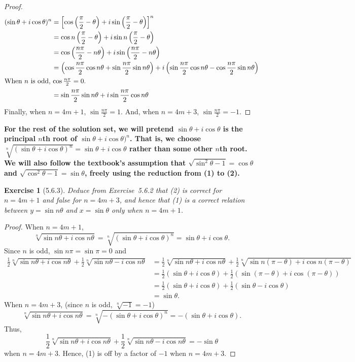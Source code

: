 \documentclass[12pt]{article}
\theoremstyle{plain}
\newtheorem{ex}{Exercise}
\begin{document}
\begin{proof}
  \begin{align*}
    (\sin\theta+i\cos\theta)^n  &= \left[\cos\left(\frac{\pi}{2}-\theta\right)+i\sin\left(\frac{\pi}{2}-\theta\right)\right]^n \\
                                &= \cos n\left(\frac{\pi}{2}-\theta\right)+i\sin n\left(\frac{\pi}{2}-\theta\right) \\
                                &= \cos\left(\frac{n\pi}{2}-n\theta\right)+i\sin\left(\frac{n\pi}{2}-n\theta\right) \\
                                &= \left(\cos\frac{n\pi}{2}\cos n\theta+\sin\frac{n\pi}{2}\sin n\theta\right)+i\left(\sin\frac{n\pi}{2}\cos n\theta-\cos\frac{n\pi}{2}\sin n\theta\right) \\
    \intertext{When $n$ is odd, $\cos\frac{n\pi}{2}=0$.}
                                &= \sin\frac{n\pi}{2}\sin n\theta+i\sin\frac{n\pi}{2}\cos n\theta
  \end{align*}
  Finally, when $n=4m+1$, $\sin\frac{n\pi}{2}=1$. And, when $n=4m+3$, $\sin\frac{n\pi}{2}=-1$.
\end{proof}

\textbf{For the rest of the solution set, we will pretend $\sin\theta+i\cos\theta$ is the principal $n$th root of $\sin\theta+i\cos\theta)^n$. That is, we choose $\sqrt[n]{(\sin\theta+i\cos\theta)^n}=\sin\theta+i\cos\theta$ rather than some other $n$th root. We will also follow the textbook's assumption that $\sqrt{\sin^2\theta-1}=\cos\theta$ and $\sqrt{\cos^2\theta-1}=\sin\theta$, freely using the reduction from (1) to (2).}

\begin{ex} [5.6.3]
  Deduce from Exercise~5.6.2 that (2) is correct for $n=4m+1$ and false for $n=4m+3$, and hence that (1) is a correct relation between $y=\sin n\theta$ and $x=\sin\theta$ only when $n=4m+1$.
\end{ex}

\begin{proof}
  When $n=4m+1$,
  \[
    \sqrt[n]{\sin n\theta+i\cos n\theta}=\sqrt[n]{(\sin\theta+i\cos\theta)^n}=\sin\theta+i\cos\theta.
  \]
  Since $n$ is odd, $\sin n\pi=\sin\pi=0$ and
  \begin{align*}
    \frac{1}{2}\sqrt[n]{\sin n\theta+i\cos n\theta}+\frac{1}{2}\sqrt[n]{\sin n\theta-i\cos n\theta} &= \frac{1}{2}\sqrt[n]{\sin n\theta+i\cos n\theta}+\frac{1}{2}\sqrt[n]{\sin n(\pi-\theta)+i\cos n(\pi-\theta)} \\
      &= \frac{1}{2}(\sin\theta+i\cos\theta)+\frac{1}{2}(\sin(\pi-\theta)+i\cos(\pi-\theta)) \\
      &= \frac{1}{2}(\sin\theta+i\cos\theta)+\frac{1}{2}(\sin\theta-i\cos\theta) \\
      &= \sin\theta.
  \end{align*}
  When $n=4m+3$, (since $n$ is odd, $\sqrt[n]{-1}=-1$)
  \[
    \sqrt[n]{\sin n\theta+i\cos n\theta}=\sqrt[n]{-(\sin\theta+i\cos\theta)^n}=-(\sin\theta+i\cos\theta).
  \]
  Thus,
  \[
    \frac{1}{2}\sqrt[n]{\sin n\theta+i\cos n\theta}+\frac{1}{2}\sqrt[n]{\sin n\theta-i\cos n\theta}=-\sin\theta
  \]
  when $n=4m+3$. Hence, (1) is off by a factor of $-1$ when $n=4m+3$.
\end{proof}
\end{document}
